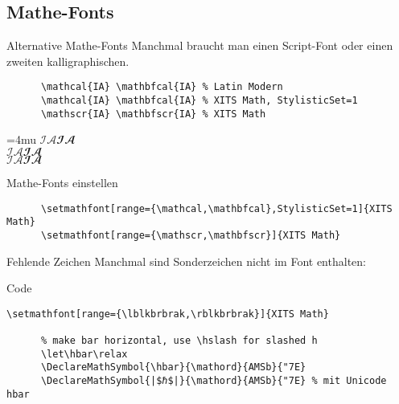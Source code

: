 \subsection{Mathe-Fonts}\label{sec:mathfonts}

\begin{frame}[fragile]{Alternative Mathe-Fonts}
  Manchmal braucht man einen Script-Font oder einen zweiten kalligraphischen.
  \vspace{1em}
  \begin{CodeExample}{0.83}
    \begin{lstlisting}
      \mathcal{IA} \mathbfcal{IA} % Latin Modern
      \mathcal{IA} \mathbfcal{IA} % XITS Math, StylisticSet=1
      \mathscr{IA} \mathbfscr{IA} % XITS Math
    \end{lstlisting}
  \CodeResult
    \Umathordordspacing\textstyle=4mu
                           $\mathcal{I A} \mathbfcal{I A}$ \\
    { $\mathcal{I A} \mathbfcal{I A}$} \\
    {    $\mathscr{I A} \mathbfscr{I A}$}
  \end{CodeExample}

  \begin{block}{Mathe-Fonts einstellen}
    \begin{lstlisting}
      \setmathfont[range={\mathcal,\mathbfcal},StylisticSet=1]{XITS Math}
      \setmathfont[range={\mathscr,\mathbfscr}]{XITS Math}
    \end{lstlisting}
  \end{block}
\end{frame}

\begin{frame}[fragile]{Fehlende Zeichen}
  Manchmal sind Sonderzeichen nicht im Font enthalten:
  \vspace{1em}
  \begin{block}{Code}
    \begin{lstlisting}[escapechar=|]
      \setmathfont[range={\lblkbrbrak,\rblkbrbrak}]{XITS Math}

      % make bar horizontal, use \hslash for slashed h
      \let\hbar\relax
      \DeclareMathSymbol{\hbar}{\mathord}{AMSb}{"7E}
      \DeclareMathSymbol{|$ℏ$|}{\mathord}{AMSb}{"7E} % mit Unicode hbar
    \end{lstlisting}
  \end{block}
\end{frame}
